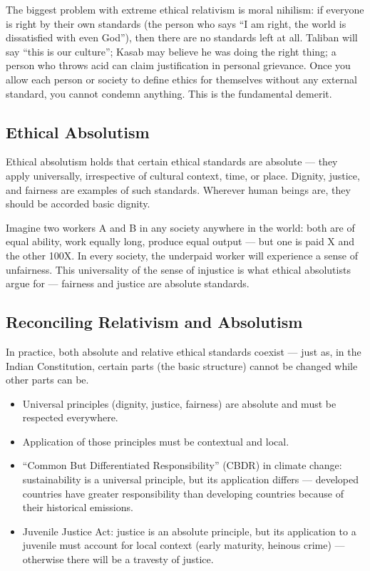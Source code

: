 \begin{CriticalPoint}
The biggest problem with extreme ethical relativism is moral nihilism: if everyone is right by their own standards (the person who says ``I am right, the world is dissatisfied with even God''), then there are no standards left at all. Taliban will say ``this is our culture''; Kasab may believe he was doing the right thing; a person who throws acid can claim justification in personal grievance. Once you allow each person or society to define ethics for themselves without any external standard, you cannot condemn anything. This is the fundamental demerit.
\end{CriticalPoint}

\subsection{Ethical Absolutism}

Ethical absolutism holds that certain ethical standards are absolute --- they apply universally, irrespective of cultural context, time, or place. Dignity, justice, and fairness are examples of such standards. Wherever human beings are, they should be accorded basic dignity.

\begin{ExampleBox}
Imagine two workers A and B in any society anywhere in the world: both are of equal ability, work equally long, produce equal output --- but one is paid X and the other 100X. In every society, the underpaid worker will experience a sense of unfairness. This universality of the sense of injustice is what ethical absolutists argue for --- fairness and justice are absolute standards.
\end{ExampleBox}

\subsection{Reconciling Relativism and Absolutism}

In practice, both absolute and relative ethical standards coexist --- just as, in the Indian Constitution, certain parts (the basic structure) cannot be changed while other parts can be.

\begin{KeyConcept}
\begin{itemize}
\item Universal principles (dignity, justice, fairness) are absolute and must be respected everywhere.
\item Application of those principles must be contextual and local.
\item ``Common But Differentiated Responsibility'' (CBDR) in climate change: sustainability is a universal principle, but its application differs --- developed countries have greater responsibility than developing countries because of their historical emissions.
\item Juvenile Justice Act: justice is an absolute principle, but its application to a juvenile must account for local context (early maturity, heinous crime) --- otherwise there will be a travesty of justice.
\end{itemize}
\end{KeyConcept}

